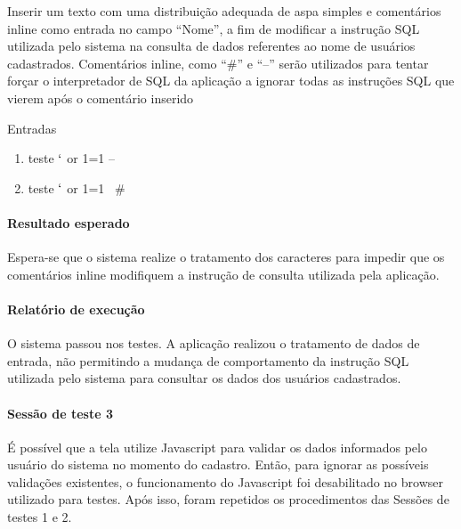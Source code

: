 \documentclass[
    12pt,               %
    openright,          %
    oneside,            %
    a4paper,            %
    section=TITLE,     %
    english,            %
    french,             %
    spanish,            %
    brazil              %
    ]{abntex2}
\begin{document}
Inserir um texto com uma distribuição adequada de aspa simples e comentários inline como entrada no campo \textquotedblleft{}Nome\textquotedblright{}, a fim de modificar a instrução SQL utilizada pelo sistema na consulta de dados referentes ao nome de usuários cadastrados. Comentários inline, como \textquotedblleft{}\#\textquotedblright{} e \textquotedblleft{}--\textquotedblright{} serão utilizados para tentar forçar o interpretador de SQL da aplicação a ignorar todas as instruções SQL que vierem após o comentário inserido


Entradas



\begin{enumerate}[start=1]
	
\item teste $\lq$ or 1=1 --
	
\item teste $\lq$ or 1=1~ \#

\end{enumerate}


\paragraph*{Resultado esperado}

Espera-se que o sistema realize o tratamento dos caracteres para impedir que os comentários inline modifiquem a instrução de consulta utilizada pela aplicação.



\paragraph*{Relatório de execução}

O sistema passou nos testes. A aplicação realizou o tratamento de dados de entrada, não permitindo a mudança de comportamento da instrução SQL utilizada pelo sistema para consultar os dados dos usuários cadastrados.



\paragraph*{Sessão de teste 3}

É possível que a tela utilize Javascript para validar os dados informados pelo usuário do sistema no momento do cadastro. Então, para ignorar as possíveis validações existentes, o funcionamento do Javascript foi desabilitado no browser utilizado para testes. Após isso, foram repetidos os procedimentos das Sessões de testes 1 e 2.
\end{document}
